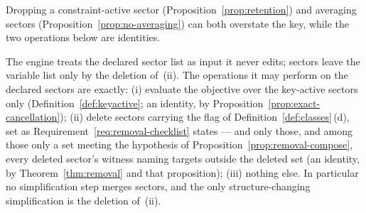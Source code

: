 
Dropping a constraint-active sector (Proposition~\ref{prop:retention}) and
averaging sectors (Proposition~\ref{prop:no-averaging}) can both overstate
the key, while the two operations below are identities.

\begin{requirement}\label{req:structure-operations}
The engine treats the declared sector list as input it never edits; sectors
leave the variable list only by the deletion of~(ii). The operations
it may perform on the declared sectors are exactly: (i) evaluate the
objective over the key-active sectors only (Definition~\ref{def:keyactive};
an identity, by Proposition~\ref{prop:exact-cancellation}); (ii) delete
sectors carrying the flag  of
Definition~\ref{def:classes}\,(d), set as
Requirement~\ref{req:removal-checklist} states --- and only those, and among those only
a set meeting the hypothesis of Proposition~\ref{prop:removal-compose},
every deleted sector's witness naming targets outside the deleted set (an
identity, by Theorem~\ref{thm:removal} and that proposition); (iii) nothing
else. In particular no simplification step merges sectors, and the only
structure-changing simplification is the deletion of~(ii).
\end{requirement}
